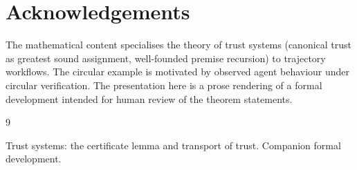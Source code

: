 \documentclass[11pt,a4paper]{article}
\theoremstyle{plain}
\theoremstyle{definition}
\begin{document}
\section*{Acknowledgements}

The mathematical content specialises the theory of trust systems (canonical
trust as greatest sound assignment, well-founded premise recursion) to
trajectory workflows. The circular example is motivated by observed agent
behaviour under circular verification. The presentation here is a prose
rendering of a formal development intended for human review of the theorem
statements.

\begin{thebibliography}{9}

Trust systems: the certificate lemma and transport of trust.
\newblock Companion formal development.

\end{thebibliography}
\end{document}
